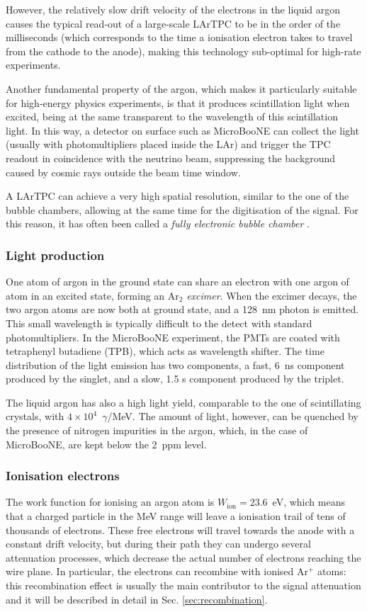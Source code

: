 However, the relatively slow drift velocity of the electrons in the liquid argon causes the typical read-out of a large-scale LArTPC to be in the order of the milliseconds (which corresponds to the time a ionisation electron takes to travel from the cathode to the anode), making this technology sub-optimal for high-rate experiments. 

Another fundamental property of the argon, which makes it particularly suitable for high-energy physics experiments, is that it produces scintillation light when excited, being at the same transparent to the wavelength of this scintillation light. In this way, a detector on surface such as MicroBooNE can collect the light (usually with photomultipliers placed inside the LAr) and trigger the TPC readout in coincidence with the neutrino beam, suppressing the background caused by cosmic rays outside the beam time window. 

A LArTPC can achieve a very high spatial resolution, similar to the one of the bubble chambers, allowing at the same time for the digitisation of the signal. For this reason, it has often been called a \emph{fully electronic bubble chamber} \cite{Rubbia:2011zza}. 

\subsubsection{Light production}
One atom of argon in the ground state can share an electron with one argon of atom in an excited state, forming an Ar$_{2}$ \emph{excimer}. When the excimer decays, the two argon atoms are now both at ground state, and a 128~nm photon is emitted. This small wavelength is typically difficult to the detect with standard photomultipliers. In the MicroBooNE experiment, the PMTs are coated with tetraphenyl butadiene (TPB), which acts as wavelength shifter. The time distribution of the light emission has two components, a fast, 6~ns component produced by the singlet, and a slow, 1.5 \si{\micro}s component produced by the triplet. 

The liquid argon has also a high light yield, comparable to the one of scintillating crystals, with $4\times10^4$~$\gamma$/MeV. The amount of light, however, can be quenched by the presence of nitrogen impurities in the argon, which, in the case of MicroBooNE, are kept below the 2~ppm level.

\subsubsection{Ionisation electrons}
The work function for ionising an argon atom is $W_{\mathrm{ion}} = 23.6$~eV, which means that a charged particle in the MeV range will leave a ionisation trail of tens of thousands of electrons. These free electrons will travel towards the anode with a constant drift velocity, but during their path they can undergo several attenuation processes, which decrease the actual number of electrons reaching the wire plane. In particular, the electrons can recombine with ionised Ar$^+$ atoms: this recombination effect is usually the main contributor to the signal attenuation and it will be described in detail in Sec. \ref{sec:recombination}. 

